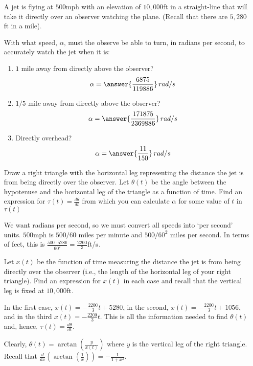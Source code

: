 \documentclass{ximera}
\author{Gregory Hartman \and Matthew Carr}
\begin{document}
\begin{exercise}



A jet is flying at $500$mph with an elevation of $10,000$ft in a straight-line that will take it directly over an observer watching the plane. (Recall that there are $5,280$ft in a mile).

With what speed, $\alpha$, must the observe be able to turn, in radians per second, to accurately watch the jet when it is:
\begin{enumerate}
\item		$1$ mile away from directly above the observer? \[\alpha=\answer{\frac{6875}{119886}}\,rad/s\]
\item		$1/5$ mile away from directly above the observer? \[\alpha=\answer{\frac{171875}{2369886}}\,rad/s\]
\item		Directly overhead? \[\alpha=\answer{\frac{11}{150}}\,rad/s\]
\end{enumerate}

\begin{hint}
Draw a right triangle with the horizontal leg representing the
distance the jet is from being directly over the observer. Let
$\theta(t)$ be the angle between the hypotenuse and the horizontal leg
of the triangle as a function of time. Find an expression for
$\tau(t)=\frac{d\theta}{dt}$ from which you can calculate $\alpha$ for
some value of $t$ in $\tau(t)$
\end{hint}
\begin{hint}
We want radians per second, so we must convert all speeds into `per
second' units. $500$mph is $500/{60}$ miles per minute and
$500/{60^2}$ miles per second. In terms of feet, this is
$\frac{500\cdot5280}{60^2}=\frac{2200}{3}$ft/s.
\end{hint}
\begin{hint}
Let $x(t)$ be the function of time measuring the distance the jet is
from being directly over the observer (i.e., the length of the
horizontal leg of your right triangle). Find an expression for $x(t)$
in each case and recall that the vertical leg is fixed at $10,000$ft.
\end{hint}
\begin{hint}
In the first case, $x(t)=-\frac{2200}{3}t+5280$, in the second,
$x(t)=-\frac{2200}{3}t+1056$, and in the third
$x(t)=-\frac{2200}{3}t$. This is all the information needed to find
$\theta(t)$ and, hence, $\tau(t)=\frac{d\theta}{dt}$.
\end{hint}
\begin{hint}
Clearly, $\theta(t)=\arctan(\frac{y}{x(t)})$ where $y$ is the vertical
leg of the right triangle. Recall that
$\frac{d}{dx}(\arctan(\frac{1}{x}))=-\frac{1}{1+x^2}$.


\end{hint}
\end{exercise}
\end{document}
